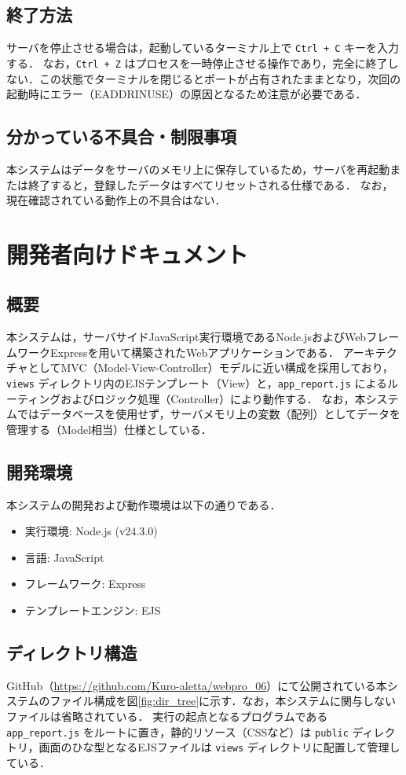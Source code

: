 \subsection{終了方法}
サーバを停止させる場合は，起動しているターミナル上で \texttt{Ctrl + C} キーを入力する．
なお，\texttt{Ctrl + Z} はプロセスを一時停止させる操作であり，完全に終了しない．この状態でターミナルを閉じるとポートが占有されたままとなり，次回の起動時にエラー（EADDRINUSE）の原因となるため注意が必要である．

\subsection{分かっている不具合・制限事項}
本システムはデータをサーバのメモリ上に保存しているため，サーバを再起動または終了すると，登録したデータはすべてリセットされる仕様である．
なお，現在確認されている動作上の不具合はない．




\section{開発者向けドキュメント}
\subsection{概要}
本システムは，サーバサイドJavaScript実行環境であるNode.jsおよびWebフレームワークExpressを用いて構築されたWebアプリケーションである．
アーキテクチャとしてMVC（Model-View-Controller）モデルに近い構成を採用しており，\texttt{views} ディレクトリ内のEJSテンプレート（View）と，\texttt{app\_report.js} によるルーティングおよびロジック処理（Controller）により動作する．
なお，本システムではデータベースを使用せず，サーバメモリ上の変数（配列）としてデータを管理する（Model相当）仕様としている．

\subsection{開発環境}
本システムの開発および動作環境は以下の通りである．
\begin{itemize}
    \item 実行環境: Node.js (v24.3.0)
    \item 言語: JavaScript
    \item フレームワーク: Express
    \item テンプレートエンジン: EJS
\end{itemize}

\subsection{ディレクトリ構造}
GitHub（\url{https://github.com/Kuro-aletta/webpro_06}）にて公開されている本システムのファイル構成を図\ref{fig:dir_tree}に示す．なお，本システムに関与しないファイルは省略されている．
実行の起点となるプログラムである \texttt{app\_report.js} をルートに置き，静的リソース（CSSなど）は \texttt{public} ディレクトリ，画面のひな型となるEJSファイルは \texttt{views} ディレクトリに配置して管理している．

